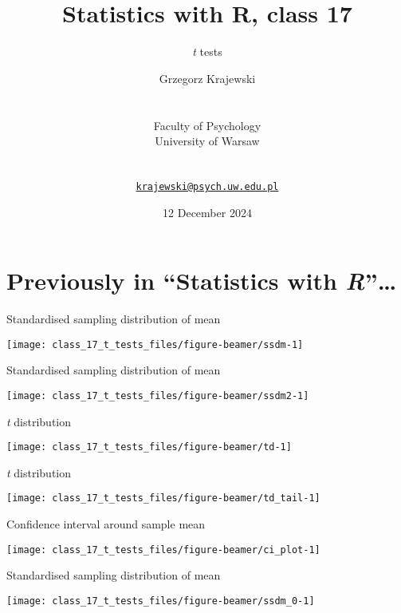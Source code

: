 \documentclass[
  ignorenonframetext,
]{beamer}
\title{Statistics with R, class 17}
\subtitle{\emph{t} tests}
\author{Grzegorz Krajewski\\
\strut \\
Faculty of Psychology\\
University of Warsaw\\
\strut \\
\href{mailto:krajewski@psych.uw.edu.pl}{\nolinkurl{krajewski@psych.uw.edu.pl}}}
\date{12 December 2024}
\begin{document}
\frame{\titlepage}

\section{\texorpdfstring{Previously in ``Statistics with
\emph{R}''\ldots{}}{Previously in ``Statistics with R''\ldots{}}}\label{previously-in-statistics-with-r}

\begin{frame}{Standardised sampling distribution of mean}
\label{standardised-sampling-distribution-of-mean}
\begin{center}\texttt{[image: class\_17\_t\_tests\_files/figure-beamer/ssdm-1]} \end{center}
\end{frame}

\begin{frame}{Standardised sampling distribution of mean}
\label{standardised-sampling-distribution-of-mean-1}
\begin{center}\texttt{[image: class\_17\_t\_tests\_files/figure-beamer/ssdm2-1]} \end{center}
\end{frame}

\begin{frame}{\emph{t} distribution}
\label{t-distribution}
\begin{center}\texttt{[image: class\_17\_t\_tests\_files/figure-beamer/td-1]} \end{center}
\end{frame}

\begin{frame}{\emph{t} distribution}
\label{t-distribution-1}
\begin{center}\texttt{[image: class\_17\_t\_tests\_files/figure-beamer/td\_tail-1]} \end{center}
\end{frame}

\begin{frame}{Confidence interval around sample mean}
\label{confidence-interval-around-sample-mean}
\begin{center}\texttt{[image: class\_17\_t\_tests\_files/figure-beamer/ci\_plot-1]} \end{center}
\end{frame}

\begin{frame}{Standardised sampling distribution of mean}
\label{standardised-sampling-distribution-of-mean-2}
\begin{center}\texttt{[image: class\_17\_t\_tests\_files/figure-beamer/ssdm\_0-1]} \end{center}
\end{frame}
\end{document}
